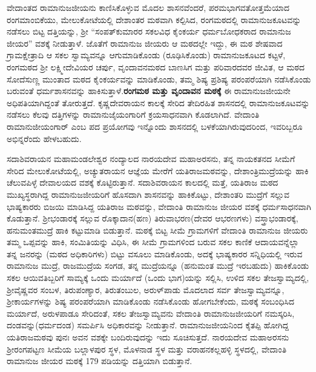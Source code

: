 ವೇದಾಂತದ ರಾಮಾನುಜಜೀಯನು ಕಾಣಿಸಿಕೊಳ್ಳುವ ಮೊದಲ ಶಾಸನವೆಂದರೆ, ಪರಮಭಾಗವತೋತ್ತಮೆಯಾದ ರಂಗಮಾಂಬಿಕೆಯು, ಮೇಲುಕೋಟೆಯಲ್ಲಿ ದೇಶಾಂತರ ಮಠವಾಗಿ ಕಲ್ಪಿಸಿದ, ರಂಗಮಠದಲ್ಲಿ ರಾಮಾನುಜಕೂಟವನ್ನು ನಡೆಸಲು ಬಿಟ್ಟ ದತ್ತಿಯನ್ನು, ಶ‍್ರೀ “ಸಂಪತ್​ಕುಮಾರರ ಸಕಲವಿಧ ಕೈಂಕರ್ಯ ಧರ್ಮಬೋಧಕರಾದ ರಾಮಾನುಜ ಜೀಯರ” ವಶಕ್ಕೆ ನೀಡುತ್ತಾಳೆ. ಜೊತೆಗೆ ರಾಮಾನುಜ ಜೀಯರು ಆ ಮಠದಲ್ಲೇ ಇದ್ದು, ಈ ಮಠ ಶೇಷವಾದ ಗ್ರಾಮಕ್ಷೇತ್ರಾದಿ ಆ ಸಕಲ ಸ್ವಾಮ್ಯವನ್ನೂ ಆಗುಮಾಡಿಕೊಂಡು (ರೂಢಿಸಿಕೊಂಡು) ರಾಮಾನುಜಕೂಟದ ಕಟ್ಟಳೆ, ರಂಗಮಠದ ಶ‍್ರೀ ಲಕ್ಷ್ಮೀದೇವಿಯರ ಚರ್ಪು, ವೃಂದಾವನಮಠದ ಬಾಣಸಿಗ ಮತ್ತು ಪರಿವಾರದವರ ಜೀವಿತ, ಆ ಮಠದ ಸೋದೆಸುಣ್ಣ ಮುಂತಾದ ಮಠದ ಕೈಂಕರ್ಯವನ್ನು ಮಾಡಿಕೊಂಡು, ತಮ್ಮ ಶಿಷ್ಯ ಪ್ರಶಿಷ್ಯ ಪರಂಪರೆಯಾಗಿ ನಡೆಸಿಕೊಂಡು ಬರುವಂತೆ ಧರ್ಮಶಾಸನವನ್ನು ಹಾಕಿಸುತ್ತಾಳೆ.\textbf{ರಂಗಮಠ ಮತ್ತು ವೃಂದಾವನ ಮಠಕ್ಕೆ} ಈ ರಾಮಾನುಜಜೀಯನೇ ಅಧಿಪತಿಯಾಗಿದ್ದಂತೆ ತೋರುತ್ತದೆ. ಕೃಷ್ಣದೇವರಾಯನ ಕಾಲಕ್ಕೆ ಸೇರಿದ ತೇದಿರಹಿತ ಶಾಸನದಲ್ಲಿ ರಾಮಾನುಜಕೂಟವನ್ನು ನಡೆಸಲು ಕೆಲವು ದತ್ತಿಗಳನ್ನು ರಾಮಾನುಜೈಯಂಗಾರಿಗೆ ಕ್ರಯಸಾಧನವಾಗಿ ಕೊಡಲಾಗಿದೆ. ವೇದಾಂತಿ ರಾಮಾನುಜೀಯಂಗಾರ್​ ಎಂಬ ಪದ ಪ್ರಯೋಗವು ಇನ್ನೊಂದು ಶಾಸನದಲ್ಲಿ ಬಳಕೆಯಾಗಿರುವುದರಿಂದ, ಇವರಿಬ್ಬರೂ ಅಭಿನ್ನರೆಂದು ಹೇಳಬಹುದು.

ಸದಾಶಿವರಾಯನ ಮಹಾಮಂಡಲೇಶ್ವರ ನಂದ್ಯಾಲದ ನಾರಯದೇವ ಮಹಾಅರಸನು, ತನ್ನ ನಾಯಕತನದ ಸೀಮೆಗೆ ಸೇರಿದ ಮೇಲುಕೋಟೆಯಲ್ಲಿ, ಅಚ್ಯುತರಾಯನ ಆಜ್ಞೆಯ ಮೇರೆಗೆ ಯತಿರಾಜಮಠವನ್ನು, ದೇಶಾಂತ್ರಿಮುದ್ರೆಯನ್ನು ಹಾಕಿ ಚೆಲುವಪಿಳ್ಳೆ ದೇವಾಲಯದ ವಶಕ್ಕೆ ಕೊಟ್ಟಿರುತ್ತಾನೆ. ಸದಾಶಿವರಾಯನ ಕಾಲದಲ್ಲಿ ಮತ್ತೆ, ಯತಿರಾಜ ಮಠದ ಮುಖ್ಯಸ್ಥರಾಗಿದ್ದ ರಾಮಾನುಜಜೀಯರಿಗೆ ಹೊಸದಾಗಿ ಶಾಸನವನ್ನು ಹಾಕಿಕೊಟ್ಟು, ದೇಶಾಂತರಿ ಮುದ್ರೆಗೆ ಸಲ್ಲುವ ಭಾಷ್ಯಕಾರರು ಬಿಜಯಿ ಮಾಡಿಸಿದ್ದ ಯತಿರಾಜ ಮಠವನ್ನು, ವೇದಾಂತಿ ರಾಮಾನುಜ ಜೀಯರ ವಶಕ್ಕೆ ಧರ್ಮಸಾಧನವಾಗಿ ಕೊಡುತ್ತಾನೆ. ಶ‍್ರೀಭಂಡಾರಕ್ಕೆ ಸಲ್ಲುವ ರೊಕ್ಕಾದಾನ(ಹಣ) ತಿರುವಾಭರಣ(ದೇವರ ಆಭರಣಗಳು) ವಸ್ತ್ರಾಭಂಡಾರಕ್ಕೆ, ಹನುಮಂತಮುದ್ರೆ ಹಾಕಿ ಕಟ್ಟುಮಾಡಿ ಬಿಡುತ್ತಾನೆ. ಮಠಕ್ಕೆ ಬಿಟ್ಟ ಸೀಮೆ ಗ್ರಾಮಗಳಿಗೆ ವೇದಾಂತಿ ರಾಮಾನುಜ ಜೀಯರು ತಮ್ಮ ಒಪ್ಪವನ್ನು ಹಾಕಿ, ಸಂಮಿತಿಯನ್ನು ವಿಧಿಸಿ, ಈ ಸೀಮೆ ಗ್ರಾಮಗಳಿಂದ ಬರುವ ಸಕಲ ಕಾಣಿಕೆ ಆದಾಯವನ್ನೆಲ್ಲಾ ತನ್ನ ಜನರನ್ನು (ಮಠದ ಅಧಿಕಾರಿಗಳು) ಬಿಟ್ಟು ವಸೂಲು ಮಾಡಿಕೊಂಡು, ಅದಕ್ಕೆ ಭಾಷ್ಯಕಾರರ ಸನ್ನಿಧಿಯಲ್ಲಿ ಇರುವ ರಾಮಾನುಜ ಮುದ್ರೆ, ರಾಜಮುದ್ರೆಯ ಸಂಗಡ, ತನ್ನ ಮುದ್ರೆಯನ್ನೂ (ಹನುಮಂತ ಮುದ್ರೆ ಇರಬಹುದು) ಹಾಕಿಕೊಂಡು ಸಕಲ ಆಯಿವತಿಬ್ಬರಿಗೆ ಸಾಮ್ಯಕ್ಕೆ ಒಂದು ಮರ್ಯಾದೆ (ಒಂದು ಭಾಗ)ಯನ್ನು ಸಲ್ಲಿಸಿ, ಉಳಿದ ಸಕಲ ತೇಜಸ್ವಾಮ್ಯದಲ್ಲಿ, ಶ‍್ರೀವೈಷ್ಣವರ ಸಂಬಳ, ತಿರುಪಂಣ್ಯಾರ, ತಿರುತಂಬುಲ, ಅರುಳ್​ಪಾಡು ಮೊದಲಾದ ಸರ್ವ ತೇಜಸ್ವಾಮ್ಯವನ್ನೂ, ಶ‍್ರೀಕಾರ್ಯಗಳನ್ನು ಶಿಷ್ಯ ಪರಂಪರೆಯಾಗಿ ಮಾಡಿಕೊಂಡು ನಡೆಸಿಕೊಂಡು ಹೋಗಬೇಕೆಂದು, ಮಠಕ್ಕೆ ಸಂಬಂಧಿಸಿದ ಮರ್ಯಾದೆ, ಅರುಳಪಾಡೂ ಸೇರಿದಂತೆ, ಸಕಲ ತೇಜಸ್ವಾಮ್ಯವನು ವೇದಾಂತಿ ರಾಮಾನುಜಜೀಯರಿಗೆ ನಮಸ್ಕರಿಸಿ, ದಂಡವನ್ನು(ಧರ್ಮದಂಡ) ಸಮರ್ಪಿಸಿ ಅಧಿಕಾರವನ್ನು ನೀಡುತ್ತಾನೆ. ರಾಮಾನುಜಜೀಯನಿಂದ ಕೈತಪ್ಪಿ ಹೋಗಿದ್ದ ಯತಿರಾಜಮಠವು ಪುನಃ ಅವನ ವಶಕ್ಕೇ ಬಂದಿರುವುದನ್ನು ಇದು ಸೂಚಿಸುತ್ತದೆ. ನಾರಯದೇವ ಮಹಾಅರಸನು ಶ‍್ರೀರಂಗಪಟ್ಟಣ ಸೀಮೆಯ ಬಲ್ಲಾಳಪುರ ಸ್ಥಳ, ಮೊಳನಾಡ ಸ್ಥಳ ಮತ್ತು ವರಾಹನಕಲ್ಲಹಳ್ಳಿ ಸ್ಥಳದಲ್ಲಿ, ವೇದಾಂತಿ ರಾಮಾನುಜ ಜೀಯರ ಮಠಕ್ಕೆ 179 ಪಡಿಯನ್ನು ದತ್ತಿಯಾಗಿ ಬಿಡುತ್ತಾನೆ.

